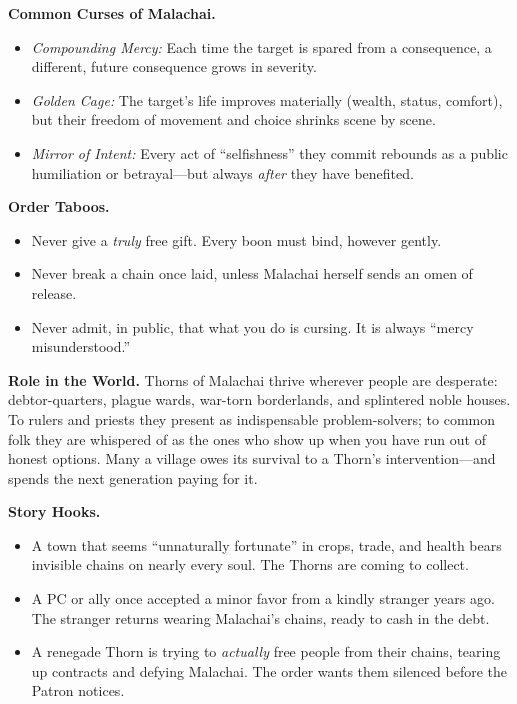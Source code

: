 \documentclass[11pt]{book}
\begin{document}
\medskip

\textbf{Common Curses of Malachai.}
\begin{itemize}[leftmargin=*]
  \item \textit{Compounding Mercy:} Each time the target is spared from a consequence, a different, future consequence grows in severity.
  \item \textit{Golden Cage:} The target's life improves materially (wealth, status, comfort), but their freedom of movement and choice shrinks scene by scene.
  \item \textit{Mirror of Intent:} Every act of ``selfishness'' they commit rebounds as a public humiliation or betrayal---but always \emph{after} they have benefited.
\end{itemize}

\medskip

\textbf{Order Taboos.}
\begin{itemize}[leftmargin=*]
  \item Never give a \emph{truly} free gift. Every boon must bind, however gently.
  \item Never break a chain once laid, unless Malachai herself sends an omen of release.
  \item Never admit, in public, that what you do is cursing. It is always ``mercy misunderstood.''
\end{itemize}

\medskip

\textbf{Role in the World.}
Thorns of Malachai thrive wherever people are desperate: debtor-quarters, plague wards, war-torn borderlands, and splintered noble houses. To rulers and priests they present as indispensable problem-solvers; to common folk they are whispered of as the ones who show up when you have run out of honest options. Many a village owes its survival to a Thorn's intervention---and spends the next generation paying for it.

\medskip

\textbf{Story Hooks.}
\begin{itemize}[leftmargin=*]
  \item A town that seems ``unnaturally fortunate'' in crops, trade, and health bears invisible chains on nearly every soul. The Thorns are coming to collect.
  \item A PC or ally once accepted a minor favor from a kindly stranger years ago. The stranger returns wearing Malachai's chains, ready to cash in the debt.
  \item A renegade Thorn is trying to \emph{actually} free people from their chains, tearing up contracts and defying Malachai. The order wants them silenced before the Patron notices.
\end{itemize}
\end{document}
